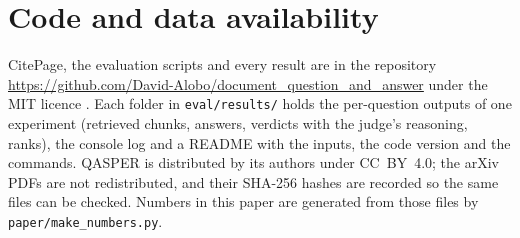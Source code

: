 \section{Code and data availability}
\label{sec:availability}

CitePage, the evaluation scripts and every result are in the repository
\url{https://github.com/David-Alobo/document_question_and_answer} under the MIT licence
. Each folder in
\texttt{eval/results/} holds the per-question outputs of one experiment (retrieved chunks,
answers, verdicts with the judge's reasoning, ranks), the console log and a README with the
inputs, the code version and the commands. QASPER is distributed by its authors under CC~BY~4.0;
the arXiv PDFs are not redistributed, and their SHA-256 hashes are recorded so the same files
can be checked. Numbers in this paper are generated from those files by
\texttt{paper/make\_numbers.py}.
